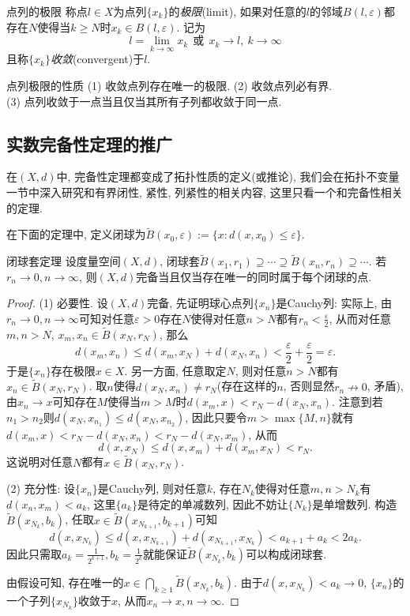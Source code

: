 \begin{definition}{点列的极限}
	称点$l \in X$为点列$\{ x_k \}$的\textit{极限}(limit), 如果对任意的$l$的邻域$B(l,\varepsilon)$都存在$N$使得当$k \geq N$时$x_k \in B(l,\varepsilon)$. 记为$$l = \lim_{k \to \infty} x_k ~~ \text{或} ~~ x_k \to l,~k \to \infty$$且称$\{ x_k \}$\textit{收敛}(convergent)于$l$. 
\end{definition}

\begin{proposition}{点列极限的性质}
	(1) 收敛点列存在唯一的极限. \qquad (2) 收敛点列必有界. \\
	(3) 点列收敛于一点当且仅当其所有子列都收敛于同一点. 
\end{proposition}

\subsection{实数完备性定理的推广}

在$(X,d)$中, 完备性定理都变成了拓扑性质的定义(或推论), 我们会在拓扑不变量一节中深入研究和有界闭性, 紧性, 列紧性的相关内容, 这里只看一个和完备性相关的定理. 

在下面的定理中, 定义闭球为$\tilde{B}(x_0,\varepsilon):=\{ x:d(x,x_0)\leq \varepsilon \}$. 

\begin{theorem}{闭球套定理}
	设度量空间$(X,d)$, 闭球套$\tilde{B}(x_1,r_1) \supseteq \cdots \supseteq \tilde{B}(x_n,r_n) \supseteq \cdots$. 若$r_n \to 0,n\to \infty$, 则$(X,d)$完备当且仅当存在唯一的同时属于每个闭球的点. 
\end{theorem}
\begin{proof}
	(1) 必要性. 设$(X,d)$完备, 先证明球心点列$\{ x_n \}$是Cauchy列: 实际上, 由$r_n \to 0,n\to \infty$可知对任意$\varepsilon >0$存在$N$使得对任意$n >N$都有$r_n<\frac{\varepsilon}{2}$, 从而对任意$m,n>N$, $x_m,x_n \in \tilde{B}(x_N,r_N)$, 那么$$d(x_m,x_n) \leq d(x_m,x_N)+d(x_N,x_n) < \frac{\varepsilon}{2} + \frac{\varepsilon}{2} = \varepsilon .$$
	于是$\{ x_n \}$存在极限$x \in X$. 另一方面, 任意取定$N$, 则对任意$n>N$都有$x_n \in \tilde{B}(x_N,r_N)$. 取$n$使得$d(x_N,x_n) \neq r_N$(存在这样的$n$, 否则显然$r_n \nrightarrow 0$, 矛盾), 由$x_n \to x$可知存在$M$使得当$m>M$时$d(x_m,x)<r_N-d(x_N,x_n)$. 注意到若$n_1>n_2$则$d(x_N,x_{n_1}) \leq d(x_N,x_{n_2})$, 因此只要令$m>\max \{ M,n \}$就有$d(x_m,x)<r_N-d(x_N,x_n)<r_N-d(x_N,x_m)$, 从而$$d(x,x_N) \leq d(x,x_m) + d(x_m,x_N) < r_N. $$
	这说明对任意$N$都有$x \in \tilde{B}(x_N,r_N)$. 
	
	(2) 充分性: 设$\{ x_n \}$是Cauchy列, 则对任意$k$, 存在$N_k$使得对任意$m,n>N_k$有$d(x_n,x_m)<a_k$, 这里$\{ a_k \}$是待定的单减数列, 因此不妨让$\{ N_k \}$是单增数列. 构造$\tilde{B}(x_{N_k},b_k)$, 任取$x \in \tilde{B}(x_{N_{k+1}},b_{k+1})$可知$$d(x,x_{N_k}) \leq d(x,x_{N_{k+1}}) + d(x_{N_{k+1}}, x_{N_{k}}) < a_{k+1}+a_k < 2a_k. $$
	因此只需取$a_k=\frac{1}{2^{k+1}}, b_k = \frac{1}{2^k}$就能保证$\tilde{B}(x_{N_k},b_k)$可以构成闭球套. 
	
	由假设可知, 存在唯一的$x \in \bigcap_{k\geq 1} \tilde{B}(x_{N_k},b_k)$. 由于$d(x,x_{N_k})<a_k\to 0$, $\{ x_n \}$的一个子列$\{ x_{N_k} \}$收敛于$x$, 从而$x_n \to x, n\to \infty$. 
\end{proof}

